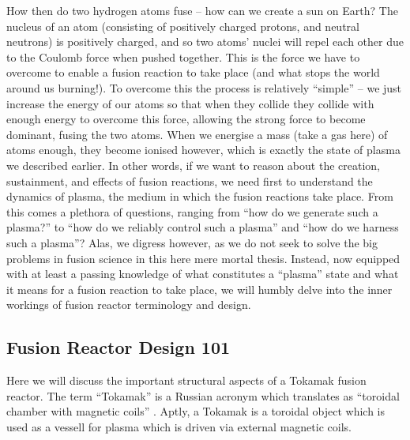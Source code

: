 How then do two hydrogen atoms fuse -- how can we create a sun on Earth? The nucleus of an atom (consisting of positively charged 
protons, and neutral neutrons) is positively charged, and so two atoms' nuclei will repel each other due to the Coulomb force when pushed together. This is the force 
we have to overcome to enable a fusion reaction to take place (and what stops the world around us burning!). To overcome this the process is relatively ``simple'' -- 
we just increase the energy of our atoms so that when they collide they collide with enough energy to overcome this force, allowing the strong force to become
dominant, fusing the two atoms. When we energise a mass (take a gas here) of atoms enough, they become ionised however, which is 
exactly the state of plasma we described earlier. In other words, if we want to reason about the creation, sustainment, and effects of 
fusion reactions, we need first to understand the dynamics of plasma, the medium in which the fusion reactions take place. From this comes a plethora of questions, ranging from 
``how do we generate such a plasma?'' to ``how do we reliably control such a plasma'' and ``how do we harness such a plasma''? Alas, we 
digress however, as we do not seek to solve the big problems in fusion science in this here mere mortal thesis. Instead, now equipped 
with at least a passing knowledge of what constitutes a ``plasma'' state and what it means for a fusion reaction to take place, 
we will humbly delve into the inner workings of fusion reactor terminology and design.


\subsection{Fusion Reactor Design 101}

Here we will discuss the important structural aspects of a Tokamak fusion reactor. The term ``Tokamak'' is a 
Russian acronym which translates as ``toroidal chamber with magnetic coils'' \cite{iter-tokamak-acronym}. Aptly, a Tokamak is a toroidal 
object which is used as a vessell for plasma which is driven via external magnetic coils. 





